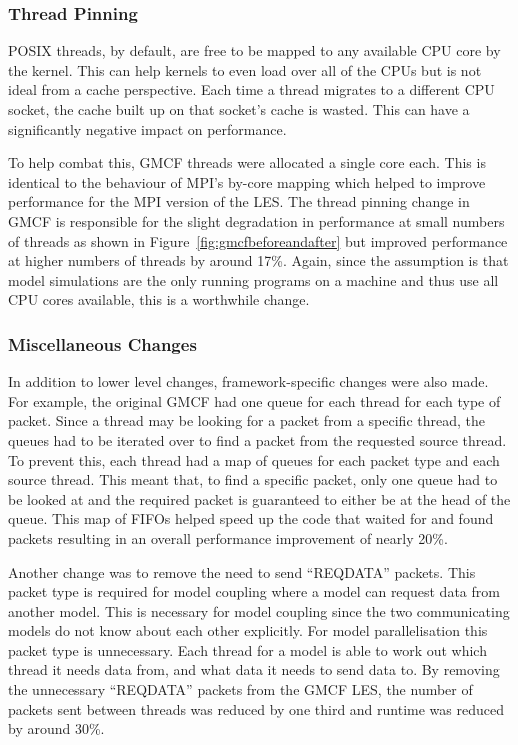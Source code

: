 \subsubsection{Thread Pinning}

POSIX threads, by default, are free to be mapped to any available CPU core by
the kernel. This can help kernels to even load over all of the CPUs but is not
ideal from a cache perspective. Each time a thread migrates to a different CPU
socket, the cache built up on that socket's cache is wasted. This can have a
significantly negative impact on performance.

To help combat this, GMCF threads were allocated a single core each. This is
identical to the behaviour of MPI's by-core mapping which helped to improve
performance for the MPI version of the LES. The thread pinning change in GMCF is
responsible for the slight degradation in performance at small numbers of
threads as shown in Figure~\ref{fig:gmcfbeforeandafter} but improved performance
at higher numbers of threads by around 17\%. Again, since the assumption is that
model simulations are the only running programs on a machine and thus use all
CPU cores available, this is a worthwhile change.

\subsubsection{Miscellaneous Changes}

In addition to lower level changes, framework-specific changes were also made.
For example, the original GMCF had one queue for each thread for each type of
packet. Since a thread may be looking for a packet from a specific thread, the
queues had to be iterated over to find a packet from the requested source
thread. To prevent this, each thread had a map of queues for each packet type
and each source thread. This meant that, to find a specific packet, only one
queue had to be looked at and the required packet is guaranteed to either be at
the head of the queue. This map of FIFOs helped speed up the code that waited
for and found packets resulting in an overall performance improvement of nearly
20\%.

Another change was to remove the need to send ``REQDATA'' packets. This packet
type is required for model coupling where a model can request data from another
model. This is necessary for model coupling since the two communicating models
do not know about each other explicitly. For model parallelisation this packet
type is unnecessary. Each thread for a model is able to work out which thread it
needs data from, and what data it needs to send data to. By removing the
unnecessary ``REQDATA'' packets from the GMCF LES, the number of packets sent
between threads was reduced by one third and runtime was reduced by around 30\%.

